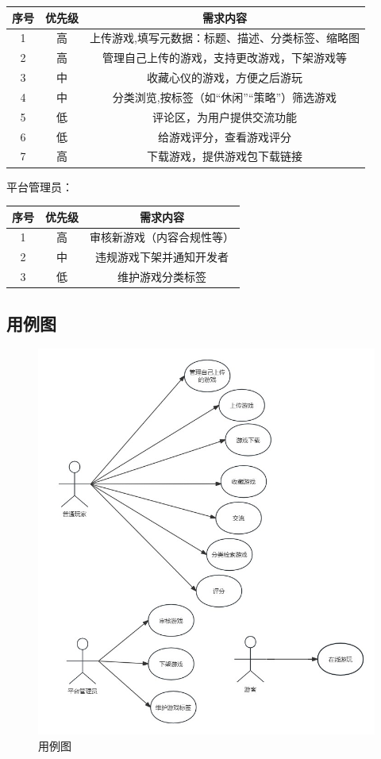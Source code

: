 \documentclass[12pt]{ctexart} %
\begin{document}
\begin{tabular}{|c|c|c|}
  \hline
  序号& 优先级& 需求内容\\
  \hline
  1 & 高& 上传游戏,填写元数据：标题、描述、分类标签、缩略图\\
  \hline
  2 & 高& 管理自己上传的游戏，支持更改游戏，下架游戏等\\
  \hline
  3 & 中& 收藏心仪的游戏，方便之后游玩\\
  \hline
  4 & 中& 分类浏览,按标签（如“休闲”“策略”）筛选游戏\\
  \hline
  5 & 低& 评论区，为用户提供交流功能\\
  \hline
  6 & 低& 给游戏评分，查看游戏评分\\
  \hline
  7 & 高& 下载游戏，提供游戏包下载链接\\
  \hline
\end{tabular}

\vspace{1cm}
平台管理员：

\begin{tabular}{|c|c|c|}
  \hline
  序号& 优先级& 需求内容\\
  \hline
  1 & 高& 审核新游戏（内容合规性等）\\
  \hline
  2 & 中& 违规游戏下架并通知开发者\\
  \hline
  3 & 低& 维护游戏分类标签\\
  \hline
\end{tabular}

\subsection{用例图}

\begin{figure}[htbp]
  \centering
  \includegraphics[width=1\textwidth]{yongli.jpg}
  \caption{用例图}
\end{figure}
\end{document}
